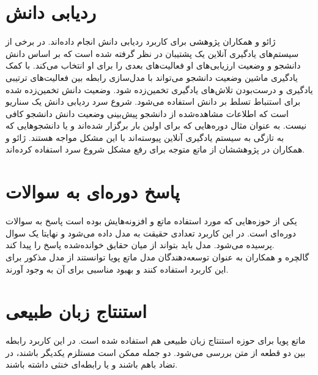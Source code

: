 \section{ردیابی دانش}
ژائو و همکاران پژوهشی برای کاربرد ردیابی دانش انجام داده‌اند. در برخی از سیستم‌های یادگیری آنلاین یک پشتیبان در نظر گرفته شده است که بر اساس دانش دانشجو و وضعیت ارزیابی‌های او فعالیت‌های بعدی را برای او انتخاب می‌کند. با کمک یادگیری ماشین وضعیت دانشجو می‌تواند با مدل‌سازی رابطه بین فعالیت‌های ترتیبی یادگیری و درست‌بودن تلاش‌های یادگیری تخمین‌زده شود. وضعیت دانش تخمین‌زده شده برای استنباط تسلط بر دانش استفاده می‌شود. شروع سرد ردیابی دانش یک سناریو است که اطلاعات مشاهده‌شده از دانشجو پیش‌بینی وضعیت دانش دانشجو کافی نیست. به عنوان مثال دوره‌هایی که برای اولین بار برگزار شده‌اند و یا دانشجوهایی که به تازگی به سیستم یادگیری آنلاین پیوسته‌اند با این مشکل مواجه هستند. ژائو و همکاران در پژوهششان از ماتع متوجه برای رفع مشکل شروع سرد استفاده کرده‌اند.\cite{zhao2020cold}

\section{پاسخ دوره‌ای به سوالات}
یکی از حوزه‌هایی که مورد استفاده ماتع و افزونه‌هایش بوده است پاسخ به سوالات دوره‌ای است. در این کاربرد تعدادی حقیقت به مدل داده می‌شود و نهایتا یک سوال پرسیده می‌شود. مدل باید بتواند از میان حقایق خوانده‌شده پاسخ را پیدا کند.
\\

گالچره و همکاران به عنوان توسعه‌دهندگان مدل ماتع پویا توانستند از مدل مذکور برای این کاربرد استفاده کنند و بهبود مناسبی برای آن به وجود آورند.\cite{gulcehre2018dynamic}

\section{استنتاج زبان طبیعی}
ماتع پویا برای حوزه استنتاج زبان طبیعی هم استفاده شده است. در این کاربرد رابطه بین دو قطعه از متن بررسی می‌شود. دو جمله ممکن است مستلزم یکدیگر باشند، در تضاد باهم باشند و یا رابطه‌ای خنثی داشته باشند.
